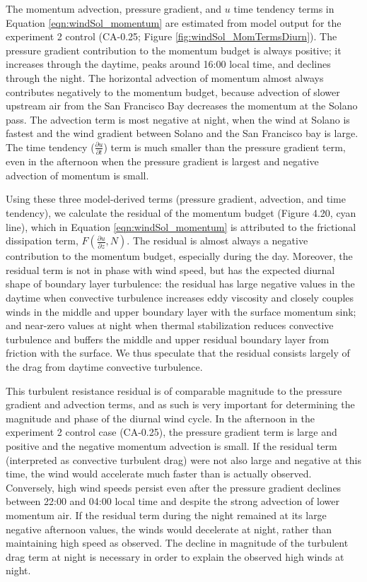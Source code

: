 The momentum advection, pressure gradient, and $u$ time tendency terms in Equation \ref{eqn:windSol_momentum} are estimated from model output for the experiment 2 control (CA-0.25; Figure \ref{fig:windSol_MomTermsDiurn}).  The pressure gradient contribution to the momentum budget is always positive; it increases through the daytime, peaks around 16:00 local time, and declines through the night.  The horizontal advection of momentum almost always contributes negatively to the momentum budget, because advection of slower upstream air from the San Francisco Bay decreases the momentum at the Solano pass.  The advection term is most negative at night, when the wind at Solano is fastest and the wind gradient between Solano and the San Francisco bay is large. The time tendency ($\frac{\partial u}{\partial t}$) term is much smaller than the pressure gradient term, even in the afternoon when the pressure gradient is largest and negative advection of momentum is small.

Using these three model-derived terms (pressure gradient, advection, and time tendency), we calculate the residual of the momentum budget (Figure  4.20, cyan line), which in Equation \ref{eqn:windSol_momentum} is attributed to the frictional dissipation term, $F\left(\frac{\partial u}{\partial z}, N\right)$. The residual is almost always a negative contribution to the momentum budget, especially during the day.  Moreover, the residual term is not in phase with wind speed, but has the expected diurnal shape of boundary layer turbulence: the residual has large negative values in the daytime when convective turbulence increases eddy viscosity and closely couples winds in the middle and upper boundary layer with the surface momentum sink; and near-zero values at night when thermal stabilization reduces convective turbulence and buffers the middle and upper residual boundary layer from friction with the surface.  We thus speculate that the residual consists largely of the drag from daytime convective turbulence.

This turbulent resistance residual is of comparable magnitude to the pressure gradient and advection terms, and as such is very important for determining the magnitude and phase of the diurnal wind cycle.  In the afternoon in the experiment 2 control case (CA-0.25), the pressure gradient term is large and positive and the negative momentum advection is small.  If the residual term (interpreted as convective turbulent drag) were not also large and negative at this time, the wind would accelerate much faster than is actually observed.  Conversely, high wind speeds persist even after the pressure gradient declines between 22:00 and 04:00 local time and despite the strong advection of lower momentum air.  If the residual term during the night remained at its large negative afternoon  values, the winds would decelerate at night, rather than maintaining high speed as observed.  The decline in magnitude of the turbulent drag term at night is necessary in order to explain the observed high winds at night.

